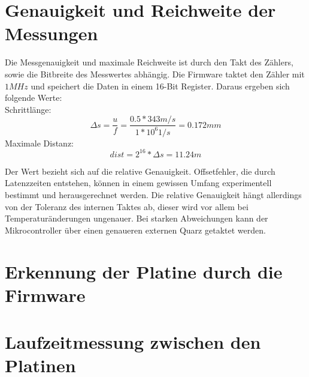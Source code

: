 \section{Genauigkeit und Reichweite der Messungen}
Die Messgenauigkeit und maximale Reichweite ist durch den Takt des Zählers, sowie die Bitbreite des Messwertes abhängig. Die Firmware taktet den Zähler mit $1MHz$ und speichert die Daten in einem 16-Bit Register. Daraus ergeben sich folgende Werte:\\
Schrittlänge:
\begin{equation} %
\Delta s = \frac{u}{f} = \frac{0.5 * 343m/s}{1*10^6 1/s} = 0.172 mm
\end{equation}
Maximale Distanz:
\begin{equation}
dist = 2^{16} * \Delta s = 11.24 m
\end{equation}

Der Wert bezieht sich auf die relative Genauigkeit. Offsetfehler, die durch Latenzzeiten entstehen, können in einem gewissen Umfang experimentell bestimmt und herausgerechnet werden. Die relative Genauigkeit hängt allerdings von der Toleranz des internen Taktes ab, dieser wird vor allem bei Temperaturänderungen ungenauer. Bei starken Abweichungen kann der Mikrocontroller über einen genaueren externen Quarz getaktet werden.

\section{Erkennung der Platine durch die Firmware}


\section{Laufzeitmessung zwischen den Platinen}

